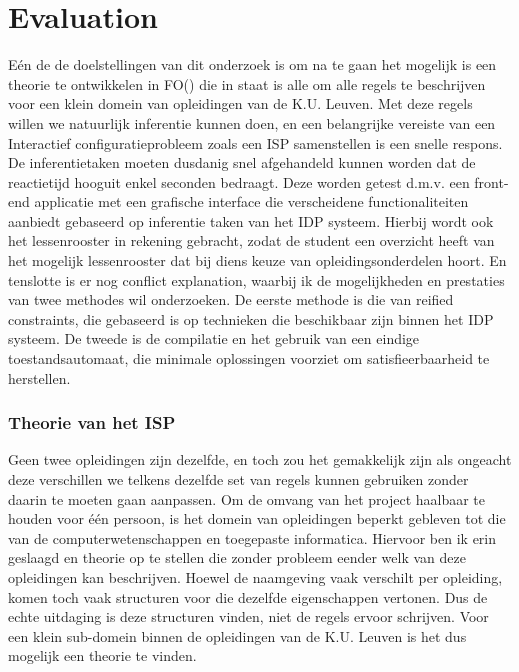 \chapter{Evaluation}
\label{cha:evaluation}
E\'{e}n de de doelstellingen van dit onderzoek is om na te gaan het mogelijk is een theorie te ontwikkelen in FO(\textperiodcentered) die in staat is alle om alle regels te beschrijven voor een klein domein van opleidingen van de K.U. Leuven. Met deze regels willen we natuurlijk inferentie kunnen doen, en een belangrijke vereiste van een Interactief configuratieprobleem zoals een ISP samenstellen is een snelle respons. De inferentietaken moeten dusdanig snel afgehandeld kunnen worden dat de reactietijd hooguit enkel seconden bedraagt. Deze worden getest d.m.v. een front-end applicatie met een grafische interface die verscheidene functionaliteiten aanbiedt gebaseerd op inferentie taken van het IDP systeem. Hierbij wordt ook het lessenrooster in rekening gebracht, zodat de student een overzicht heeft van het mogelijk lessenrooster dat bij diens keuze van opleidingsonderdelen hoort. En tenslotte is er nog conflict explanation, waarbij ik de mogelijkheden en prestaties van twee methodes wil onderzoeken. De eerste methode is die van reified constraints, die gebaseerd is op technieken die beschikbaar zijn binnen het IDP systeem. De tweede is de compilatie en het gebruik van een eindige toestandsautomaat, die minimale oplossingen voorziet om satisfieerbaarheid te herstellen.

\subsection{Theorie van het ISP}
Geen twee opleidingen zijn dezelfde, en toch zou het gemakkelijk zijn als ongeacht deze verschillen we telkens dezelfde set van regels kunnen gebruiken zonder daarin te moeten gaan aanpassen. Om de omvang van het project haalbaar te houden voor \'{e}\'{e}n persoon, is het domein van opleidingen beperkt gebleven tot die van de computerwetenschappen en toegepaste informatica. Hiervoor ben ik erin geslaagd en theorie op te stellen die zonder probleem eender welk van deze opleidingen kan beschrijven. Hoewel de naamgeving vaak verschilt per opleiding, komen toch vaak structuren voor die dezelfde eigenschappen vertonen. Dus de echte uitdaging is deze structuren vinden, niet de regels ervoor schrijven. Voor een klein sub-domein binnen de opleidingen van de K.U. Leuven is het dus mogelijk een theorie te vinden. 

